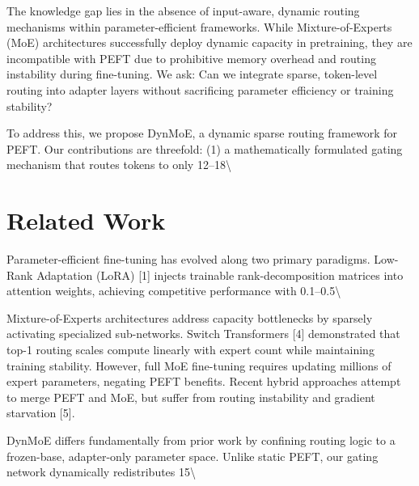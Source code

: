 \documentclass[11pt,a4paper]{article}
\begin{document}
The knowledge gap lies in the absence of input-aware, dynamic routing mechanisms within parameter-efficient frameworks. While Mixture-of-Experts (MoE) architectures successfully deploy dynamic capacity in pretraining, they are incompatible with PEFT due to prohibitive memory overhead and routing instability during fine-tuning. We ask: Can we integrate sparse, token-level routing into adapter layers without sacrificing parameter efficiency or training stability?

To address this, we propose DynMoE, a dynamic sparse routing framework for PEFT. Our contributions are threefold: (1) a mathematically formulated gating mechanism that routes tokens to only 12–18\textbackslash{}%

\section{Related Work}
Parameter-efficient fine-tuning has evolved along two primary paradigms. Low-Rank Adaptation (LoRA) [1] injects trainable rank-decomposition matrices into attention weights, achieving competitive performance with 0.1–0.5\textbackslash{}%

Mixture-of-Experts architectures address capacity bottlenecks by sparsely activating specialized sub-networks. Switch Transformers [4] demonstrated that top-1 routing scales compute linearly with expert count while maintaining training stability. However, full MoE fine-tuning requires updating millions of expert parameters, negating PEFT benefits. Recent hybrid approaches attempt to merge PEFT and MoE, but suffer from routing instability and gradient starvation [5].

DynMoE differs fundamentally from prior work by confining routing logic to a frozen-base, adapter-only parameter space. Unlike static PEFT, our gating network dynamically redistributes 15\textbackslash{}%
\end{document}
